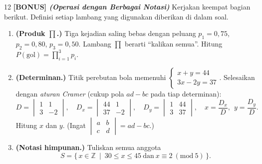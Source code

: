 \documentclass[11pt]{article}
\newenvironment{subsoal}{%
  \begin{enumerate}[label=\textbf{(\alph*)},leftmargin=1.8em,itemsep=5pt,topsep=3pt]}%
  {\end{enumerate}}
\begin{document}
\begin{soal}{12 \normalfont\bfseries[BONUS] \normalfont\itshape(Operasi dengan Berbagai Notasi)}
Kerjakan keempat bagian berikut. Definisi setiap lambang yang digunakan diberikan
di dalam soal.

\begin{subsoal}
  \item \textbf{(Produk $\prod$.)} Tiga kejadian saling bebas dengan
        peluang $p_1=0{,}75$, $p_2=0{,}80$, $p_3=0{,}50$. Lambang $\prod$ berarti
        ``kalikan semua''. Hitung $P(\text{gol})=\displaystyle\prod_{i=1}^{3}p_i$.
        \begin{center}
        \end{center}
  \item \textbf{(Determinan.)} Titik perebutan bola memenuhi
        $\begin{cases}x+y=44\\ 3x-2y=37\end{cases}$. Selesaikan dengan
        \emph{aturan Cramer} (cukup pola $ad-bc$ pada tiap determinan):
        \[
        D=\begin{vmatrix}1&1\\ 3&-2\end{vmatrix},\quad
        D_x=\begin{vmatrix}44&1\\ 37&-2\end{vmatrix},\quad
        D_y=\begin{vmatrix}1&44\\ 3&37\end{vmatrix},\quad
        x=\frac{D_x}{D},\ \ y=\frac{D_y}{D}.
        \]
        Hitung $x$ dan $y$. \Big(Ingat $\begin{vmatrix}a&b\\ c&d\end{vmatrix}=ad-bc$.\Big)
  \item \textbf{(Notasi himpunan.)} Tuliskan semua anggota
        \[
        S=\{\,x\in\mathbb{Z}\ \mid\ 30\le x\le 45\ \text{dan}\ x\equiv 2\ (\mathrm{mod}\ 5)\,\}.
\]
\end{subsoal}
\end{soal}
\end{document}
